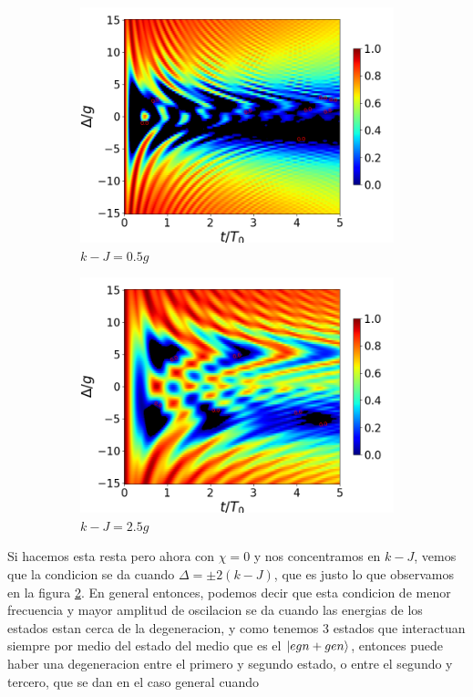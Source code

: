 \begin{figure}[h]
    \vfill
    \begin{subfigure}{0.49\textwidth}
        \includegraphics[width=\textwidth]{figuras/ch4/concu/delta/eg1+ge1 k=0.5g x=0.0g J=0.0g gamma=0.25g concu delta dis.png}
        \caption{$k-J=0.5g$}
        \label{fig4:concu detunning 1 k1}
    \end{subfigure}
    \hfill
    \begin{subfigure}{0.49\textwidth}
        \includegraphics[width=\textwidth]{figuras/ch4/concu/delta/eg1+ge1 k=2.5g x=0.0g J=0.0g gamma=0.25g concu delta dis.png}
        \caption{$k-J=2.5g$}
        \label{fig4:concu detunning 1 k2}
    \end{subfigure}
    \caption{}
    \label{fig4:concu detunning 1 params}
\end{figure}
Si hacemos esta resta pero ahora con $\chi=0$ y nos concentramos en $k-J$, vemos que la condicion se da cuando $\Delta=\pm 2(k-J)$, que es justo lo que observamos en la figura \ref{fig4:concu detunning 1 k2}. En general entonces, podemos decir que esta condicion de menor frecuencia y mayor amplitud de oscilacion se da cuando las energias de los estados estan cerca de la degeneracion, y como tenemos 3 estados que interactuan siempre por medio del estado del medio que es el $\ket{egn+gen}$, entonces puede haber una degeneracion entre el primero y segundo estado, o entre el segundo y tercero, que se dan en el caso general cuando

